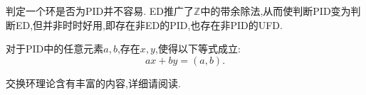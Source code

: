 判定一个环是否为PID并不容易. ED推广了$\mathbb{Z}$中的带余除法,从而使判断PID变为判断ED,但并非时时好用,即存在非ED的PID,也存在非PID的UFD.
\begin{theorem}[裴蜀定理]
	对于PID中的任意元素$a,b$,存在$x,y$,使得以下等式成立:
	\[
	ax+by=(a,b).
	\]
\end{theorem}

交换环理论含有丰富的内容,详细请阅读\cite{Atiyah}\cite{Matsumura}.
